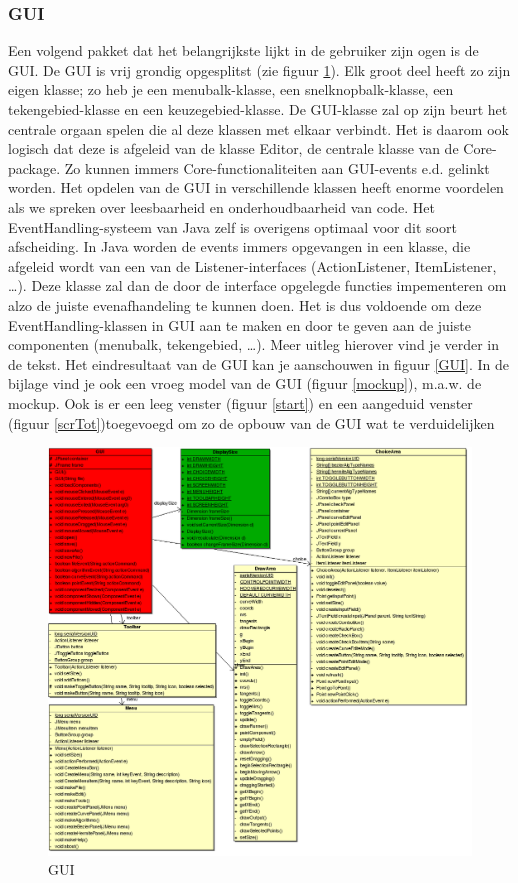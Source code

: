 \documentclass[a4paper,11pt,oneside, titlepage]{article}
\begin{document}
\subsubsection{GUI}
Een volgend pakket dat het belangrijkste lijkt in de gebruiker zijn ogen is de GUI. De GUI is vrij grondig opgesplitst (zie figuur \ref{iGui}). Elk groot deel heeft zo zijn eigen klasse; 
zo heb je een menubalk-klasse, een snelknopbalk-klasse, een tekengebied-klasse en een keuzegebied-klasse. \newline
De GUI-klasse zal op zijn beurt het centrale orgaan spelen die al deze klassen met elkaar verbindt.
Het is daarom ook logisch dat deze is afgeleid van de klasse Editor,
de centrale klasse van de Core-package. Zo kunnen immers Core-functionaliteiten aan GUI-events e.d. gelinkt worden.
\newline
Het opdelen van de GUI in verschillende klassen heeft enorme voordelen als we spreken 
over leesbaarheid en onderhoudbaarheid van code. Het EventHandling-systeem van Java zelf is overigens
optimaal voor dit soort afscheiding. In Java worden de events immers opgevangen in een klasse,
die afgeleid wordt van een van de Listener-interfaces (ActionListener, ItemListener, \ldots). Deze 
klasse zal dan de door de interface opgelegde functies impementeren om alzo de juiste evenafhandeling te kunnen
doen. Het is dus voldoende om deze EventHandling-klassen in GUI aan te maken en door te geven
aan de juiste componenten (menubalk, tekengebied, \ldots). Meer uitleg hierover vind je verder in
de tekst. Het eindresultaat van de GUI kan je aanschouwen in figuur \ref{GUI}.
In de bijlage vind je ook een vroeg model van de GUI (figuur \ref{mockup}), m.a.w. de mockup.
Ook is er een leeg venster (figuur \ref{start}) en een aangeduid venster (figuur \ref{scrTot})toegevoegd
om zo de opbouw van de GUI wat te verduidelijken
\begin{figure}[htbp]
\centering
\includegraphics[scale=0.4]{./UML2/GUI.png}
\caption{GUI}\label{iGui}
\end{figure}
\end{document}
